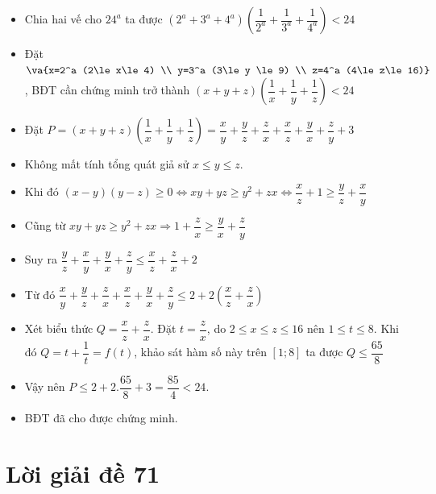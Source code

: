 \lgi 
\begin{itemize}[label=,leftmargin=*]
\item Chia hai vế cho $24^a$ ta được $(2^a+3^a+4^a)\left(\dfrac{1}{2^a}+\dfrac{1}{3^a}+\dfrac{1}{4^a} \right)<24$
\item Đặt $\va{x=2^a (2\le x\le 4) \\ y=3^a (3\le y \le 9) \\ z=4^a (4\le z\le 16)}$, BĐT cần chứng minh trở thành $(x+y+z)\left(\dfrac{1}{x}+\dfrac{1}{y}+\dfrac{1}{z} \right)< 24$
\item Đặt $P=(x+y+z)\left(\dfrac{1}{x}+\dfrac{1}{y}+\dfrac{1}{z} \right)=\dfrac{x}{y}+\dfrac{y}{z}+\dfrac{z}{x}+\dfrac{x}{z}+\dfrac{y}{x}+\dfrac{z}{y}+3$
\item Không mất tính tổng quát giả sử $x\le y \le z$. 
\item Khi đó $(x-y)(y-z)\ge 0\Leftrightarrow xy+yz \ge y^2+zx \Leftrightarrow \dfrac{x}{z}+1 \ge \dfrac{y}{z}+\dfrac{x}{y}$
\item Cũng từ $xy+yz \ge y^2+zx \Rightarrow 1+\dfrac{z}{x}\ge \dfrac{y}{x}+\dfrac{z}{y}$
\item Suy ra $\dfrac{y}{z}+\dfrac{x}{y}+\dfrac{y}{x}+\dfrac{z}{y}\le \dfrac{x}{z}+\dfrac{z}{x}+2$
\item Từ đó $\dfrac{x}{y}+\dfrac{y}{z}+\dfrac{z}{x}+\dfrac{x}{z}+\dfrac{y}{x}+\dfrac{z}{y} \le 2+2\left( \dfrac{x}{z}+\dfrac{z}{x}\right)$
\item Xét biểu thức $Q=\dfrac{x}{z}+\dfrac{z}{x}$. Đặt $t=\dfrac{z}{x}$, do $2\le x\le z \le 16$ nên $1\le t \le 8$. Khi đó $Q=t+\dfrac{1}{t}=f(t)$, khảo sát hàm số này trên $[1;8]$ ta được $Q\le \dfrac{65}{8}$
\item Vậy nên $P\le 2+2.\dfrac{65}{8}+3=\dfrac{85}{4}<24$. 
\item BĐT đã cho được chứng minh.
\end{itemize}

\section{Lời giải đề 71}

